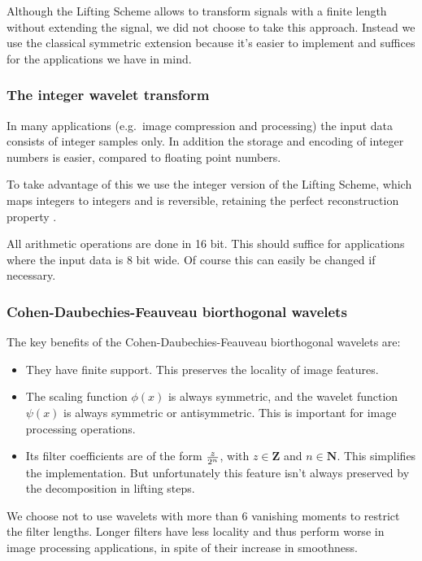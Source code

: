 Although the Lifting Scheme allows to transform signals with a finite length
without extending the signal, we did not choose to take this approach. Instead
we use the classical symmetric extension \cite{bris:acha96} because it's
easier to implement and suffices for the applications we have in mind.


\subsubsection{The integer wavelet transform}

In many applications (e.g.\ image compression and processing) the input data
consists of integer samples only. In addition the storage and encoding of
integer numbers is easier, compared to floating point numbers.

To take advantage of this we use the integer version of the Lifting Scheme,
which maps integers to integers and is reversible, retaining the perfect
reconstruction property \cite{cdsy:integer}.

All arithmetic operations are done in 16 bit. This should suffice for
applications where the input data is 8 bit wide. Of course this can easily be
changed if necessary.


\subsubsection{Cohen-Daubechies-Feauveau biorthogonal wavelets}

The key benefits of the Cohen-Daubechies-Feauveau biorthogonal wavelets \cite{coh-dau-fea:biorthogonal} are:
\begin{itemize}
\item They have finite support. This preserves the locality of image features.
\item The scaling function $\phi(x)$ is always symmetric, and the wavelet
      function $\psi(x)$ is always symmetric or antisymmetric. This is
      important for image processing operations.
\item Its filter coefficients are of the form $z\over2^n$, with $z \in
      \mathbf{Z}$ and $n \in \mathbf{N}$. This simplifies the implementation.
      But unfortunately this feature isn't always preserved by the
      decomposition in lifting steps.
\end{itemize}

We choose not to use wavelets with more than 6 vanishing moments to restrict
the filter lengths. Longer filters have less locality and thus perform worse in
image processing applications, in spite of their increase in smoothness.

